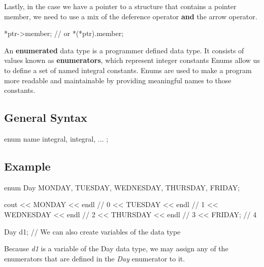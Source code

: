\documentclass{report}
\begin{document}
	\bigbreak \noindent 
	
	\bigbreak \noindent 
	Lastly, in the case we have a pointer to a structure that contains a pointer member, we need to use a mix of the deference operator \textbf{and} the arrow operator. 
	\bigbreak \noindent 
	
	\begin{cppcode}
*ptr->member;
// or
*(*ptr).member;
	\end{cppcode}
	

	\pagebreak
	\bigbreak \noindent 
	\begin{concept}
	   An \textbf{enumerated} data type is a programmer defined data type. It consists of values known as \textbf{enumerators}, which represent integer constants 
       \bigbreak \noindent 
       Enums allow us to define a set of named integral constants. Enums are used to make a program more readable and maintainable by providing meaningful names to those constants.
	\end{concept}
	\bigbreak \noindent 
    \subsection{General Syntax}
    \bigbreak \noindent 
    \begin{cppcode}
        enum name {
            integral, integral, ...
        };

    \end{cppcode}
    \bigbreak \noindent 
    \subsection{Example}
    \bigbreak \noindent 
	\begin{cppcode}
enum Day { MONDAY, TUESDAY, WEDNESDAY, THURSDAY, FRIDAY};

cout << MONDAY << endl      // 0
    << TUESDAY << endl      // 1
    << WEDNESDAY << endl    // 2
    << THURSDAY << endl     // 3
    << FRIDAY;              // 4

Day d1; // We can also create variables of the data type
	\end{cppcode}
	
	\bigbreak \noindent 
    Because \textit{d1} is a variable of the Day data type, we may assign any of the enumerators that are defined in the \textit{Day} enumerator to it.
\end{document}
